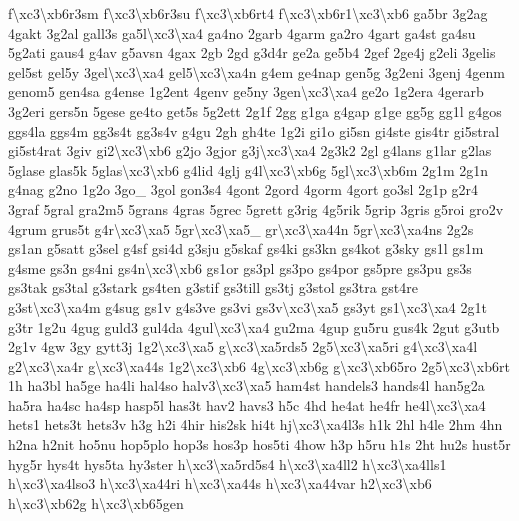 \begin{DoxyCompactItemize}
f\textbackslash{}xc3\textbackslash{}xb6r3sm f\textbackslash{}xc3\textbackslash{}xb6r3su f\textbackslash{}xc3\textbackslash{}xb6rt4 f\textbackslash{}xc3\textbackslash{}xb6r1\textbackslash{}xc3\textbackslash{}xb6 ga5br 3g2ag 4gakt 3g2al gall3s ga5l\textbackslash{}xc3\textbackslash{}xa4 ga4no 2garb 4garm ga2ro 4gart ga4st ga4su 5g2ati gaus4 g4av g5avsn 4gax 2gb 2gd g3d4r ge2a ge5b4 2gef 2ge4j g2eli 3gelis gel5st gel5y 3gel\textbackslash{}xc3\textbackslash{}xa4 gel5\textbackslash{}xc3\textbackslash{}xa4n g4em ge4nap gen5g 3g2eni 3genj 4genm genom5 gen4sa g4ense 1g2ent 4genv ge5ny 3gen\textbackslash{}xc3\textbackslash{}xa4 ge2o 1g2era 4gerarb 3g2eri gers5n 5gese ge4to get5s 5g2ett 2g1f 2gg g1ga g4gap g1ge gg5g gg1l g4gos ggs4la ggs4m gg3s4t gg3s4v g4gu 2gh gh4te 1g2i gi1o gi5sn gi4ste gis4tr gi5stral gi5st4rat 3giv gi2\textbackslash{}xc3\textbackslash{}xb6 g2jo 3gjor g3j\textbackslash{}xc3\textbackslash{}xa4 2g3k2 2gl g4lans g1lar g2las 5glase glas5k 5glas\textbackslash{}xc3\textbackslash{}xb6 g4lid 4glj g4l\textbackslash{}xc3\textbackslash{}xb6g 5gl\textbackslash{}xc3\textbackslash{}xb6m 2g1m 2g1n g4nag g2no 1g2o 3go\-\_\- 3gol gon3s4 4gont 2gord 4gorm 4gort go3sl 2g1p g2r4 3graf 5gral gra2m5 5grans 4gras 5grec 5grett g3rig 4g5rik 5grip 3gris g5roi gro2v 4grum grus5t g4r\textbackslash{}xc3\textbackslash{}xa5 5gr\textbackslash{}xc3\textbackslash{}xa5\-\_\- gr\textbackslash{}xc3\textbackslash{}xa44n 5gr\textbackslash{}xc3\textbackslash{}xa4ns 2g2s gs1an g5satt g3sel g4sf gsi4d g3sju g5skaf gs4ki gs3kn gs4kot g3sky gs1l gs1m g4sme gs3n gs4ni gs4n\textbackslash{}xc3\textbackslash{}xb6 gs1or gs3pl gs3po gs4por gs5pre gs3pu gs3s gs3tak gs3tal g3stark gs4ten g3stif gs3till gs3tj g3stol gs3tra gst4re g3st\textbackslash{}xc3\textbackslash{}xa4m g4sug gs1v g4s3ve gs3vi gs3v\textbackslash{}xc3\textbackslash{}xa5 gs3yt gs1\textbackslash{}xc3\textbackslash{}xa4 2g1t g3tr 1g2u 4gug guld3 gul4da 4gul\textbackslash{}xc3\textbackslash{}xa4 gu2ma 4gup gu5ru gus4k 2gut g3utb 2g1v 4gw 3gy gytt3j 1g2\textbackslash{}xc3\textbackslash{}xa5 g\textbackslash{}xc3\textbackslash{}xa5rds5 2g5\textbackslash{}xc3\textbackslash{}xa5ri g4\textbackslash{}xc3\textbackslash{}xa4l g2\textbackslash{}xc3\textbackslash{}xa4r g\textbackslash{}xc3\textbackslash{}xa44s 1g2\textbackslash{}xc3\textbackslash{}xb6 4g\textbackslash{}xc3\textbackslash{}xb6g g\textbackslash{}xc3\textbackslash{}xb65ro 2g5\textbackslash{}xc3\textbackslash{}xb6rt 1h ha3bl ha5ge ha4li hal4so halv3\textbackslash{}xc3\textbackslash{}xa5 ham4st handels3 hands4l han5g2a ha5ra ha4sc ha4sp hasp5l has3t hav2 havs3 h5c 4hd he4at he4fr he4l\textbackslash{}xc3\textbackslash{}xa4 hets1 hets3t hets3v h3g h2i 4hir his2sk hi4t hj\textbackslash{}xc3\textbackslash{}xa4l3s h1k 2hl h4le 2hm 4hn h2na h2nit ho5nu hop5plo hop3s hos3p hos5ti 4how h3p h5ru h1s 2ht hu2s hust5r hyg5r hys4t hys5ta hy3ster h\textbackslash{}xc3\textbackslash{}xa5rd5s4 h\textbackslash{}xc3\textbackslash{}xa4ll2 h\textbackslash{}xc3\textbackslash{}xa4lls1 h\textbackslash{}xc3\textbackslash{}xa4lso3 h\textbackslash{}xc3\textbackslash{}xa44ri h\textbackslash{}xc3\textbackslash{}xa44s h\textbackslash{}xc3\textbackslash{}xa44var h2\textbackslash{}xc3\textbackslash{}xb6 h\textbackslash{}xc3\textbackslash{}xb62g h\textbackslash{}xc3\textbackslash{}xb65gen 
\end{DoxyCompactItemize}
